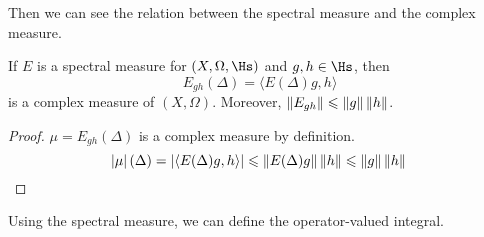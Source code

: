 Then we can see the relation between the spectral measure and the complex measure.
\begin{prop}
	If $E$ is a spectral measure for $(X,\Omega,\Hs)$ and $g,h \in \Hs$, then
	\begin{equation*}
		E_{gh}(\Delta) = \langle E(\Delta)g, h \rangle
	\end{equation*}
	is a complex measure of $(X,\Omega)$. Moreover, $\left\lVert E_{gh}\right\lVert \leqslant \left\lVert g\right\lVert\left\lVert h\right\lVert$.
\end{prop}
\begin{proof}
	$\mu=E_{gh}(\Delta)$ is a complex measure by definition.
	\begin{equation*}
		\left\lvert\mu\right\lvert(\Delta) = \left\lvert\langle E(\Delta)g, h \rangle\right\lvert \leqslant \left\lVert E(\Delta)g\right\lVert\left\lVert h\right\lVert \leqslant \left\lVert g\right\lVert\left\lVert h\right\lVert \qedhere
	\end{equation*}
\end{proof}

Using the spectral measure, we can define the operator-valued integral.

